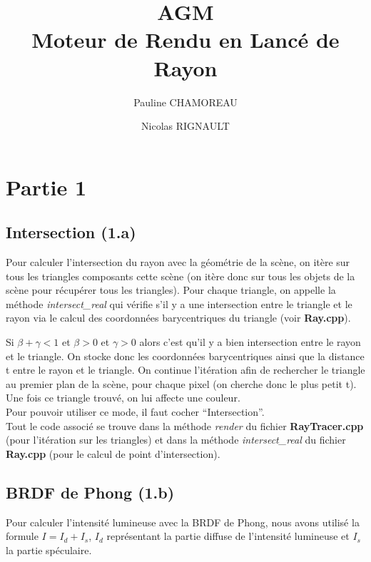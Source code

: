 \documentclass[a4paper,11pt,titlepage]{article}
\title{AGM\\Moteur de Rendu en Lancé de Rayon}
\author{Pauline CHAMOREAU \and Nicolas RIGNAULT}
\begin{document}
\maketitle

\newpage
\section{Partie 1}

\subsection{Intersection (1.a)}

Pour calculer l'intersection du rayon avec la géométrie de la scène, on itère sur tous les triangles composants cette scène (on itère donc sur tous les objets de la scène pour récupérer tous les triangles). Pour chaque triangle, on appelle la méthode \textit{intersect\_real} qui vérifie s'il y a une intersection entre le triangle et le rayon via le calcul des coordonnées barycentriques du triangle (voir \textbf{Ray.cpp}).

Si $\beta + \gamma < 1$ et $\beta > 0$ et $\gamma > 0$ alors c'est qu'il y a bien intersection entre le rayon et le triangle. On stocke donc les coordonnées barycentriques ainsi que la distance t entre le rayon et le triangle. On continue l'itération afin de rechercher le triangle au premier plan de la scène, pour chaque pixel (on cherche donc le plus petit t). Une fois ce triangle trouvé, on lui affecte une couleur.\\

Pour pouvoir utiliser ce mode, il faut cocher ``Intersection''.\\

Tout le code associé se trouve dans la méthode \textit{render} du fichier \textbf{RayTracer.cpp} (pour l'itération sur les triangles) et dans la méthode \textit{intersect\_real} du fichier \textbf{Ray.cpp} (pour le calcul de point d'intersection).

\subsection{BRDF de Phong (1.b)}

Pour calculer l'intensité lumineuse avec la BRDF de Phong, nous avons utilisé la formule $I = I_d + I_s$, $I_d$ représentant la partie diffuse de l'intensité lumineuse et $I_s$ la partie spéculaire. \\
\end{document}

